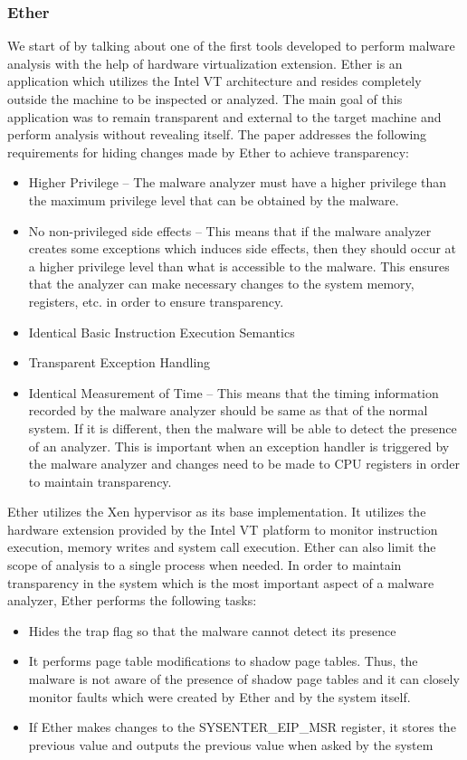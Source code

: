 \documentclass[11pt]{article}
\begin{document}
	\subsubsection{Ether}
	We start of by talking about one of the first tools developed to perform malware analysis with the help of hardware virtualization extension. Ether is an application which utilizes the Intel VT architecture and resides completely outside the machine to be inspected or analyzed. The main goal of this application was to remain transparent and external to the target machine and perform analysis without revealing itself. The paper addresses the following requirements for hiding changes made by Ether to achieve transparency:
	\begin{itemize}
		\item Higher Privilege – The malware analyzer must have a higher privilege than the maximum privilege level that can be obtained by the malware. 
		\item No non-privileged side effects – This means that if the malware analyzer creates some exceptions which induces side effects, then they should occur at a higher privilege level than what is accessible to the malware. This ensures that the analyzer can make necessary changes to the system memory, registers, etc. in order to ensure transparency.
		\item Identical Basic Instruction Execution Semantics
		\item Transparent Exception Handling
		\item Identical Measurement of Time – This means that the timing information recorded by the malware analyzer should be same as that of the normal system. If it is different, then the malware will be able to detect the presence of an analyzer. This is important when an exception handler is triggered by the malware analyzer and changes need to be made to CPU registers in order to maintain transparency.
	\end{itemize}
	Ether utilizes the Xen hypervisor as its base implementation. It utilizes the hardware extension provided by the Intel VT platform to monitor instruction execution, memory writes and system call execution. Ether can also limit the scope of analysis to a single process when needed. In order to maintain transparency in the system which is the most important aspect of a malware analyzer, Ether performs the following tasks:
	\begin{itemize}
		\item Hides the trap flag so that the malware cannot detect its presence
		\item It performs page table modifications to shadow page tables. Thus, the malware is not aware of the presence of shadow page tables and it can closely monitor faults which were created by Ether and by the system itself.
		\item If Ether makes changes to the SYSENTER\_EIP\_MSR register, it stores the previous value and outputs the previous value when asked by the system
	\end{itemize}
\end{document}

